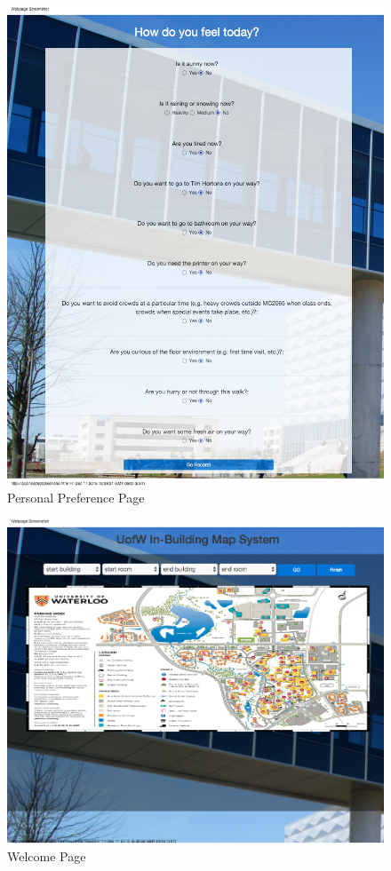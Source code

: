 \documentclass{sigchi}
\begin{document}
\begin{figure}[!h]
\centering
\includegraphics[width=1.0\columnwidth]{pics/personal_page.png}
\caption{Personal Preference Page}
\label{fig:personal_page}
\end{figure}

\begin{figure}[!h]
\centering
\includegraphics[width=1.0\columnwidth]{pics/routedraw_page.png}
\caption{Welcome Page}
\label{fig:routedraw_page}
\end{figure}
\end{document}
